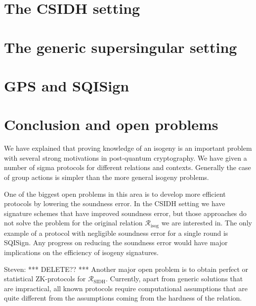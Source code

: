 \documentclass{llncs}
\newcommand{\R}[1][]{\ensuremath{\mathcal{R}_{\mathrm{#1}}}}
\newcommand{\comment}[1]{{\color{gray}#1}}
\newcommand{\SG}[1]{\comment{Steven: #1}}
\begin{document}






\section{The CSIDH setting\label{sec:CSIDH-setting}}






\section{The generic supersingular setting \label{sec:SIDH-setting}}





\section{GPS and SQISign\label{sec:GPSandSQIsign}}



\section{Conclusion and open problems\label{sec:conclusion}}

We have explained that proving knowledge of an isogeny is an important problem with several strong motivations in post-quantum cryptography.
%
We have given a number of sigma protocols for different relations and contexts. Generally the case of group actions is simpler than the more general isogeny problems.

One of the biggest open problems in this area is to develop more efficient protocols by lowering the soundness error.
In the CSIDH setting we have signature schemes that have improved soundness error, but those approaches do not solve the problem for the original relation $\R[isog]$ we are interested in.
The only example of a protocol with negligible soundness error for a single round is SQISign.
Any progress on reducing the soundness error would have major implications on the efficiency of isogeny signatures.

\SG{*** DELETE?? ***} Another major open problem is to obtain perfect or statistical ZK-protocols for $\R[SIDH]$. Currently, apart from generic solutions that are impractical, all known protocols require computational assumptions that are quite different from the assumptions coming from the hardness of the relation.










\end{document}
